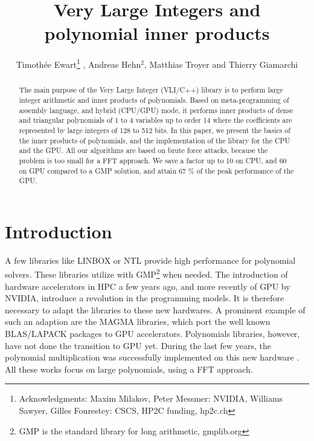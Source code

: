 \documentclass[oribibl]{llncs2e/llncs}
\title{Very Large Integers  and polynomial inner products}
\author{Timoth\'ee Ewart\inst{1}\thanks{Acknowledgments: Maxim Milakov, Peter Messmer:   NVIDIA,   Williams Sawyer, Gilles Fourestey:  CSCS, HP2C funding, hp2c.ch}  , Andreas Hehn$^2$, Matthias Troyer\inst{2} and Thierry Giamarchi\inst{1}}
\institute{Universit\'e de Gen\`eve, \email{timothee.ewart@gmail.com}  \and Eidgen\"ossische Technische Hochschule Z\"urich }
\begin{document}
\maketitle
\begin{abstract}
The main purpose of the  Very Large Integer (VLI/C++) library is to perform large integer arithmetic and  inner products of polynomials. Based on meta-programming of assembly language,
and  hybrid (CPU/GPU) mode, it performs inner products of dense and triangular polynomials  of 1 to 4 variables  up to order 14 where the coefficients are represented  by large integers of 128 to 512 bits. 
In this paper, we present the basics of the inner products of polynomials, and  the implementation of the library for the CPU and the GPU.  All our algorithms are based on brute force attacks, because the problem is too small for a FFT approach. We save a factor up to 10 on CPU, and 60 on GPU compared to a GMP solution,
and attain 67 \% of the peak performance of the GPU.
\end{abstract}
\section{Introduction}
 A few libraries like  LINBOX or NTL  provide high performance for polynomial solvers.
These libraries utilize with GMP\footnote{GMP is the standard library for long arithmetic, gmplib.org} when needed. 
The introduction of hardware accelerators in HPC a few years ago, and more recently of GPU  by NVIDIA, introduce a revolution in the programming models. 
It is therefore necessary  to adapt the libraries to these new hardwares.  A prominent example of such an adaption are the MAGMA libraries, which port the well known BLAS/LAPACK packages to GPU accelerators.
Polynomials libraries, however,  have not done the transition to GPU yet.
During the last few years, the polynomial multiplication was successfully implemented on this new hardware
\cite{Govindaraju2008, Emeliyanenko:2009, Moreno2010}. All these works focus on large polynomials,
 using a FFT approach. 
\end{document}
